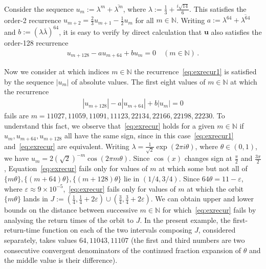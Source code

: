 \documentclass[a4paper,UKenglish,cleveref, autoref, thm-restate]{lipics-v2021}
\def\N{\mathbb{N}}
\begin{document}
\begin{example}
  Consider the sequence $u_m:=\lambda^m+\overline{\lambda^m}$, where
  $\lambda:=\frac{1}{3}+\frac{i\sqrt{14}}{6}$.  This satisfies the order-2 recurrence
  $u_{m+2}=\frac{2}{3}u_{m+1}-\frac{1}{2}u_m$ for all $m\in\mathbb N$.  
Writing
  $a:=\lambda^{64}+\overline{\lambda^{64}}$ and
  $b:=(\lambda\overline{\lambda})^{64}$, it is easy to verify by direct calculation that $\boldsymbol u$ also
  satisfies the order-128 recurrence 
  \begin{gather}u_{m+128}-a u_{m+64}+b u_m=0\quad (m\in \mathbb N)\, .
  \label{eq:exrecur1}
  \end{gather}

Now we consider at which indices $m\in\N$
the recurrence~\eqref{eq:exrecur1} is satisfied by the sequence $|u_m|$ of absolute values.  The first eight values of $m\in\mathbb N$ 
  at which the recurrence 
  \begin{gather} |u_{m+128}|-a|u_{m+64}|+b|u_m|=0
\label{eq:exrecur}
\end{gather}
fails are $m=11027,11059,11091,11123,22134,22166,22198,22230$.  
To understand this fact, we observe that~\eqref{eq:exrecur} holds for a given 
$m\in\mathbb N$ if $u_m,u_{m+64},u_{m+128}$ all have the same sign, since in this case~\eqref{eq:exrecur1} and~\eqref{eq:exrecur} are equivalent.
Writing $\lambda=\frac{1}{\sqrt{2}}\exp(2\pi i \theta)$, where $\theta \in (0,1)$, we have 
$u_m = 2(\sqrt{2})^{-m}\cos(2\pi  m\theta)$. 
Since
$\cos(x)$ changes sign at $\frac{\pi}{2}$ and $\frac{3\pi}{2}$, Equation~\eqref{eq:exrecur} fails only for values of $m$ at which 
some but not all of  $\{m\theta\},\{(m+64)\theta\},\{(m+128)\theta\}$ lie in $(1/4,3/4)$.
Since $64\theta=11-\varepsilon$, where $\varepsilon\approx  9\times 10^{-5}$,~\eqref{eq:exrecur} fails only for values of $m$ at which 
the orbit $\{m\theta\}$ lands in
$J:=\left(\frac{1}{4},\frac{1}{4}+2\varepsilon\right) \cup \left(\frac{3}{4},\frac{3}{4}+2\varepsilon\right)$.  We can obtain upper and lower 
bounds on the distance between successive $m\in\mathbb N$ for which~\eqref{eq:exrecur} fails by 
analysing the return times of the orbit to $J$.  In the present example, the first-return-time function on 
each of the two intervals composing $J$, considered separately, takes values  
$64,11043,11107$ (the first and third numbers are two consecutive convergent denominators of  the continued fraction expansion of $\theta$ and the middle value 
is their difference).
\label{ex:approximation}
  \end{example}
\end{document}
